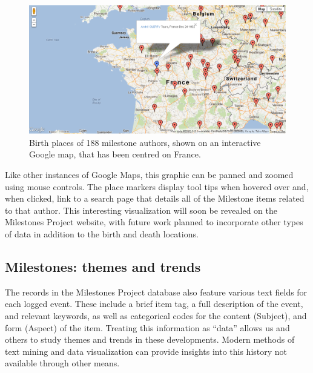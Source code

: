 \begin{figure}[!htb]
  \centering
  \includegraphics[width=\textwidth,clip]{fig/authormap}
  \caption{Birth places of 188 milestone authors, shown on an interactive Google map, that has been centred on France.}
  \label{fig:authormap}
\end{figure}

Like other instances of Google Maps, this graphic can be panned and zoomed using mouse controls. 
The place markers display tool tips when hovered over and, when clicked, link to a search page that details all of the 
Milestone items related to that author. This interesting visualization will soon be revealed on the Milestones Project website, 
with future work planned to incorporate other types of data in addition to the birth and death locations.

\subsection{Milestones: themes and trends}\label{sec:themes}
The records in the Milestones Project database also feature various text fields for each logged event. 
These include a brief item tag, a full description of the event, and relevant keywords, as well as categorical codes 
for the content (Subject), and form  (Aspect) of the item. Treating this information as ``data'' allows us and others to 
study themes and trends in these developments.  
Modern methods of text mining and data visualization can provide insights into this history not available through other means.

